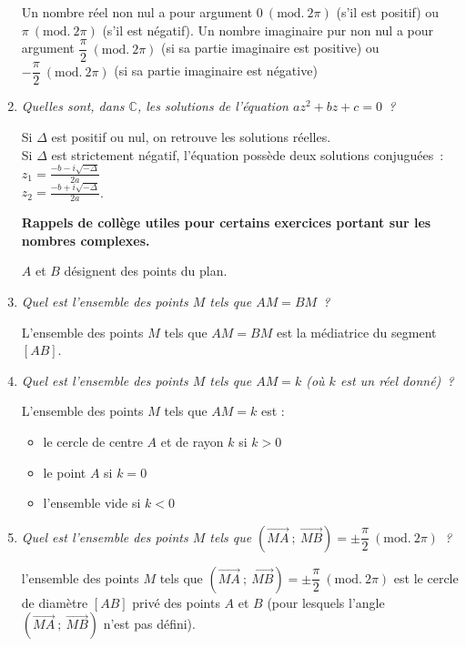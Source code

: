 \begin{reponses}
\begin{enumerate}
          \par
          Un nombre réel non nul a pour argument $0~(\text{mod.}~2\pi)$ (s'il est positif) ou $\pi~(\text{mod.}~2\pi)$ (s'il est négatif).
          Un nombre imaginaire pur non nul a pour argument $\dfrac{\pi}{2}~(\text{mod.}~2\pi)$ (si sa partie imaginaire est positive) ou $-\dfrac{\pi}{2}~(\text{mod.}~2\pi)$ (si sa partie imaginaire est négative)
          \item %
          \textit{Quelles sont, dans $\mathbb{C}$,  les solutions de l'équation $az^2+bz+c=0$~?}
          \par
          Si $\Delta$ est positif ou nul, on retrouve les solutions réelles.\\
          Si $\Delta$ est strictement négatif, l'équation possède deux solutions conjuguées~:\\
          $z_{1}=\frac{-b-i\sqrt{-\Delta }}{2a}  $ \\
          $z_{2}=\frac{-b+i\sqrt{-\Delta }}{2a}$.
          \par
          \bigskip
          \textbf{Rappels de collège utiles pour certains exercices portant sur les nombres complexes.}
          \par
          $A$ et $B$ désignent des points du plan.
          \item %
          \textit{Quel est l'ensemble des points $M$ tels que $AM=BM$~?}
          \par
          L'ensemble des points $M$ tels que $AM=BM$ est la médiatrice du segment $[AB]$.
          \item %
          \textit{Quel est l'ensemble des points $M$ tels que $AM=k $ (où $k$ est un réel donné)~?}
          \par
          L'ensemble des points $M$ tels que $AM=k$ est :
          \begin{itemize}
               \item %
               le cercle de centre $A$ et de rayon $k$ si $k > 0$
               \item %
               le point $A$  si $k = 0$
               \item %
               l'ensemble vide  si $k < 0$
          \end{itemize}
          \item %
          \textit{Quel est l'ensemble des points $M$ tels que $(\overrightarrow{MA}~;~\overrightarrow{MB})=\pm \dfrac{\pi}{2}~(\text{mod.}~2\pi)$~?}
          \par
          l'ensemble des points $M$ tels que $(\overrightarrow{MA}~;~\overrightarrow{MB})=\pm \dfrac{\pi}{2}~(\text{mod.}~2\pi)$ est le cercle de diamètre $[AB]$ privé des points $A$ et $B$ (pour lesquels l'angle $(\overrightarrow{MA}~;~\overrightarrow{MB})$ n'est pas défini).
     \end{enumerate}
\end{reponses}
